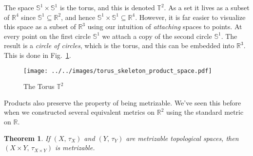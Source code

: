 \documentclass{article}
\theoremstyle{plain}
\newtheorem{theorem}{Theorem}[section]
\theoremstyle{normal}
\newenvironment{example}{%
    \pushQED{\qed}\renewcommand{\qedsymbol}{$\blacksquare$}\examplex%
}{%
    \popQED\endexamplex%
}
\begin{document}
        \begin{example}
            The space $\mathbb{S}^{1}\times\mathbb{S}^{1}$ is the torus, and
            this is denoted $\mathbb{T}^{2}$. As a set it lives as a subset of
            $\mathbb{R}^{4}$ since $\mathbb{S}^{1}\subseteq\mathbb{R}^{2}$,
            and hence $\mathbb{S}^{1}\times\mathbb{S}^{1}\subseteq\mathbb{R}^{4}$.
            However, it is far easier to visualize this space as a subset of
            $\mathbb{R}^{3}$ using our intuition of \textit{attaching} spaces
            to points. At every point on the first circle $\mathbb{S}^{1}$
            we attach a copy of the second circle $\mathbb{S}^{1}$. The result
            is a \textit{circle of circles}, which is the torus, and this can
            be embedded into $\mathbb{R}^{3}$. This is done in
            Fig.~\ref{fig:torus_skeleton_product_space}.
        \end{example}
        \begin{figure}
            \centering
            \texttt{[image: ../../images/torus\_skeleton\_product\_space.pdf]}
            \caption{The Torus $\mathbb{T}^{2}$}
            \label{fig:torus_skeleton_product_space}
        \end{figure}
        Products also preserve the property of being metrizable. We've seen
        this before when we constructed several equivalent metrics on
        $\mathbb{R}^{2}$ using the standard metric on $\mathbb{R}$.
        \begin{theorem}
            If $(X,\,\tau_{X})$ and $(Y,\,\tau_{Y})$ are metrizable topological
            spaces, then $(X\times{Y},\,\tau_{X\times{Y}})$ is metrizable.
        \end{theorem}
\end{document}
